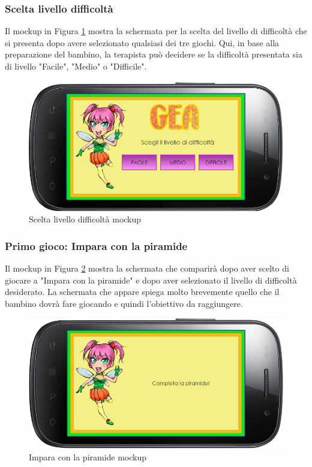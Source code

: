 \subsubsection{Scelta livello difficoltà}
Il mockup in Figura \ref{fig:Scelta livello difficoltà} mostra la schermata per la scelta del livello di difficoltà che si presenta dopo avere selezionato qualsiasi dei tre giochi. Qui, in base alla preparazione del bambino, la terapista può decidere se la difficoltà presentata sia di livello "Facile", "Medio" o "Difficile".

\vspace{70pt}

\begin{figure}[htbp]
\centering
\includegraphics[width=\textwidth]{Images/Mockup/livelli}
\caption{Scelta livello difficoltà mockup}
\label{fig:Scelta livello difficoltà}
\end{figure}
\clearpage
\subsubsection{Primo gioco: Impara con la piramide}
Il mockup in Figura \ref{fig:Impara con la piramide} mostra la schermata che comparirà dopo aver scelto di giocare a "Impara con la piramide" e dopo aver selezionato il livello di difficoltà desiderato. La schermata che appare spiega molto brevemente quello che il bambino dovrà fare giocando e quindi l'obiettivo da raggiungere.
\vspace{70pt}
\begin{figure}[htbp]
\centering
\includegraphics[width=\textwidth]{Images/Mockup/gioco1}
\caption{Impara con la piramide mockup}
\label{fig:Impara con la piramide}
\end{figure}
\clearpage

